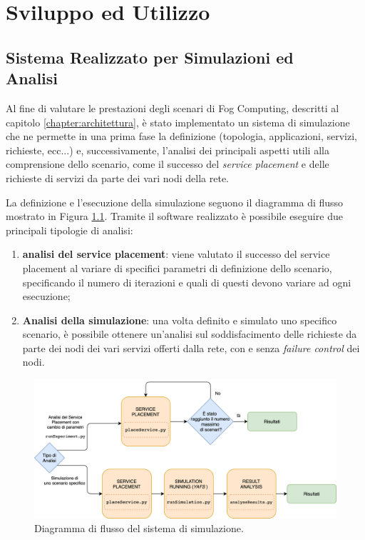 \chapter{Sviluppo ed Utilizzo}
\label{chapter:implementazione}

\section[Sistema Realizzato per Simulazioni ed Analisi]{Sistema Realizzato per Simulazioni ed\\ Analisi}
\label{section:sistema_analisi}

Al fine di valutare le prestazioni degli scenari di Fog Computing, descritti al capitolo \ref{chapter:architettura}, è stato implementato un sistema di simulazione che ne permette in una prima fase la definizione (topologia, applicazioni, servizi, richieste, ecc...) e, successivamente, l'analisi dei principali aspetti utili alla comprensione dello scenario, come il successo del \textit{service placement} e delle richieste di servizi da parte dei vari nodi della rete.

La definizione e l'esecuzione della simulazione seguono il diagramma di flusso mostrato in Figura \ref{fig:sim_flow_diagram}. Tramite il software realizzato è possibile eseguire due principali tipologie di analisi:
\begin{enumerate}
	\item \textbf{analisi del service placement}: viene valutato il successo del service placement al variare di specifici parametri di definizione dello scenario, specificando il numero di iterazioni e quali di questi devono variare ad ogni esecuzione;
	\item \textbf{Analisi della simulazione}: una volta definito e simulato uno specifico scenario, è possibile ottenere un'analisi sul soddisfacimento delle richieste da parte dei nodi dei vari servizi offerti dalla rete, con e senza \textit{failure control} dei nodi.
\end{enumerate}


\begin{figure}[!ht]
  \includegraphics[width=14cm]{images/sim_flow_diagram}
  \centering
  \caption{Diagramma di flusso del sistema di simulazione.}
  \label{fig:sim_flow_diagram}
\end{figure}

